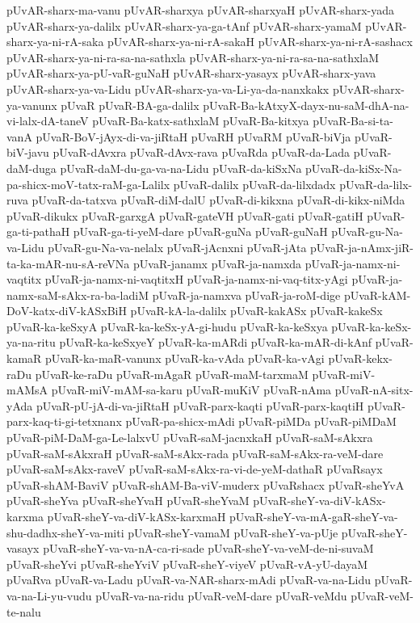 {pUvAR-sharx-ma-vanu
pUvAR-sharxya
pUvAR-sharxyaH
pUvAR-sharx-yada
pUvAR-sharx-ya-dalilx
pUvAR-sharx-ya-ga-tAnf
pUvAR-sharx-yamaM
pUvAR-sharx-ya-ni-rA-saka
pUvAR-sharx-ya-ni-rA-sakaH
pUvAR-sharx-ya-ni-rA-sashacx
pUvAR-sharx-ya-ni-ra-sa-na-sathxla
pUvAR-sharx-ya-ni-ra-sa-na-sathxlaM
pUvAR-sharx-ya-pU-vaR-guNaH
pUvAR-sharx-yasayx
pUvAR-sharx-yava
pUvAR-sharx-ya-va-Lidu
pUvAR-sharx-ya-va-Li-ya-da-nanxkakx
pUvAR-sharx-ya-vanunx
pUvaR
pUvaR-BA-ga-dalilx
pUvaR-Ba-kAtxyX-dayx-nu-saM-dhA-na-vi-lalx-dA-taneV
pUvaR-Ba-katx-sathxlaM
pUvaR-Ba-kitxya
pUvaR-Ba-si-ta-vanA
pUvaR-BoV-jAyx-di-va-jiRtaH
pUvaRH
pUvaRM
pUvaR-biVja
pUvaR-biV-javu
pUvaR-dAvxra
pUvaR-dAvx-rava
pUvaRda
pUvaR-da-Lada
pUvaR-daM-duga
pUvaR-daM-du-ga-va-na-Lidu
pUvaR-da-kiSxNa
pUvaR-da-kiSx-Na-pa-shicx-moV-tatx-raM-ga-Lalilx
pUvaR-dalilx
pUvaR-da-lilxdadx
pUvaR-da-lilx-ruva
pUvaR-da-tatxva
pUvaR-diM-dalU
pUvaR-di-kikxna
pUvaR-di-kikx-niMda
pUvaR-dikukx
pUvaR-garxgA
pUvaR-gateVH
pUvaR-gati
pUvaR-gatiH
pUvaR-ga-ti-pathaH
pUvaR-ga-ti-yeM-dare
pUvaR-guNa
pUvaR-guNaH
pUvaR-gu-Na-va-Lidu
pUvaR-gu-Na-va-nelalx
pUvaR-jAcnxni
pUvaR-jAta
pUvaR-ja-nAmx-jiR-ta-ka-mAR-nu-sA-reVNa
pUvaR-janamx
pUvaR-ja-namxda
pUvaR-ja-namx-ni-vaqtitx
pUvaR-ja-namx-ni-vaqtitxH
pUvaR-ja-namx-ni-vaq-titx-yAgi
pUvaR-ja-namx-saM-sAkx-ra-ba-ladiM
pUvaR-ja-namxva
pUvaR-ja-roM-dige
pUvaR-kAM-DoV-katx-diV-kASxBiH
pUvaR-kA-la-dalilx
pUvaR-kakASx
pUvaR-kakeSx
pUvaR-ka-keSxyA
pUvaR-ka-keSx-yA-gi-hudu
pUvaR-ka-keSxya
pUvaR-ka-keSx-ya-na-ritu
pUvaR-ka-keSxyeY
pUvaR-ka-mARdi
pUvaR-ka-mAR-di-kAnf
pUvaR-kamaR
pUvaR-ka-maR-vanunx
pUvaR-ka-vAda
pUvaR-ka-vAgi
pUvaR-kekx-raDu
pUvaR-ke-raDu
pUvaR-mAgaR
pUvaR-maM-tarxmaM
pUvaR-miV-mAMsA
pUvaR-miV-mAM-sa-karu
pUvaR-muKiV
pUvaR-nAma
pUvaR-nA-sitx-yAda
pUvaR-pU-jA-di-va-jiRtaH
pUvaR-parx-kaqti
pUvaR-parx-kaqtiH
pUvaR-parx-kaq-ti-gi-tetxnanx
pUvaR-pa-shicx-mAdi
pUvaR-piMDa
pUvaR-piMDaM
pUvaR-piM-DaM-ga-Le-lalxvU
pUvaR-saM-jacnxkaH
pUvaR-saM-sAkxra
pUvaR-saM-sAkxraH
pUvaR-saM-sAkx-rada
pUvaR-saM-sAkx-ra-veM-dare
pUvaR-saM-sAkx-raveV
pUvaR-saM-sAkx-ra-vi-de-yeM-dathaR
pUvaRsayx
pUvaR-shAM-BaviV
pUvaR-shAM-Ba-viV-muderx
pUvaRshacx
pUvaR-sheYvA
pUvaR-sheYva
pUvaR-sheYvaH
pUvaR-sheYvaM
pUvaR-sheY-va-diV-kASx-karxma
pUvaR-sheY-va-diV-kASx-karxmaH
pUvaR-sheY-va-mA-gaR-sheY-va-shu-dadhx-sheY-va-miti
pUvaR-sheY-vamaM
pUvaR-sheY-va-pUje
pUvaR-sheY-vasayx
pUvaR-sheY-va-va-nA-ca-ri-sade
pUvaR-sheY-va-veM-de-ni-suvaM
pUvaR-sheYvi
pUvaR-sheYviV
pUvaR-sheY-viyeV
pUvaR-vA-yU-dayaM
pUvaRva
pUvaR-va-Ladu
pUvaR-va-NAR-sharx-mAdi
pUvaR-va-na-Lidu
pUvaR-va-na-Li-yu-vudu
pUvaR-va-na-ridu
pUvaR-veM-dare
pUvaR-veMdu
pUvaR-veM-te-nalu
}
